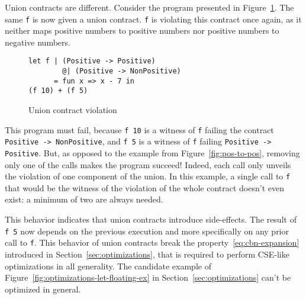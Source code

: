 \documentclass[sigplan,10pt,review,anonymous]{acmart}
\newcommand{\nickel}[1]{\lstinline[language=nickel]{#1}}
\begin{document}
%

Union contracts are different. Consider the program presented in
Figure~\ref{fig:wrong-union-function}. The same \nickel{f} is now given a union
contract. \nickel{f} is violating this contract once again, as it neither maps
positive numbers to positive numbers nor positive numbers to negative numbers.

\begin{figure}[h]
\begin{lstlisting}[language=nickel]
let f | (Positive -> Positive)
        @| (Positive -> NonPositive)
      = fun x => x - 7 in
(f 10) + (f 5)
\end{lstlisting}
\caption{Union contract violation}
\label{fig:wrong-union-function}
\end{figure}

This program must fail, because \nickel{f 10} is a witness of \nickel{f} failing
the contract \nickel{Positive -> NonPositive}, and \nickel{f 5} is a witness of
\nickel{f} failing \nickel{Positive -> Positive}.  But, as opposed to the
example from Figure~\ref{fig:pos-to-pos}, removing only one of the calls makes the
program succeed! Indeed, each call only unveils the violation of one component
of the union. In this example, a single call to \nickel{f} that would be the
witness of the violation of the whole contract doesn't even exist: a minimum of
two are always needed.

This behavior indicates that union contracts introduce side-effects. The result
of \nickel{f 5} now depends on the previous execution and more specifically on
any prior call to \nickel{f}. This behavior of union contracts break the
property~\ref{eq:cbn-expansion} introduced in Section~\ref{sec:optimizations},
that is required to perform CSE-like optimizations in all generality. The
candidate example of Figure~\ref{fig:optimizations-let-floating-ex} in
Section~\ref{sec:optimizations} can't be optimized in general.
\end{document}
